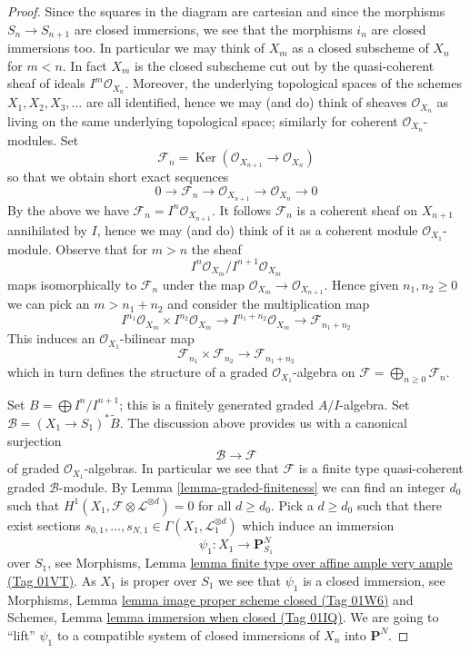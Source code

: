 \documentclass{amsart}
\theoremstyle{plain}
\theoremstyle{definition}
\theoremstyle{remark}
\numberwithin{equation}{subsection}
\def\Ker{\mathop{\mathrm{Ker}}}
\begin{document}
\begin{proof}
Since the squares in the diagram are cartesian and since the morphisms
$S_n \to S_{n + 1}$ are closed immersions, we see that the morphisms
$i_n$ are closed immersions too. In particular we may think of
$X_m$ as a closed subscheme of $X_n$ for $m < n$. In fact $X_m$ is
the closed subscheme cut out by the quasi-coherent sheaf of ideals
$I^m\mathcal{O}_{X_n}$. Moreover, the underlying topological spaces
of the schemes $X_1, X_2, X_3, \ldots$ are all identified, hence we
may (and do) think of sheaves $\mathcal{O}_{X_n}$ as living on the
same underlying topological space; similarly for coherent
$\mathcal{O}_{X_n}$-modules. Set
$$
\mathcal{F}_n =
\Ker(\mathcal{O}_{X_{n + 1}} \to \mathcal{O}_{X_n})
$$
so that we obtain short exact sequences
$$
0 \to \mathcal{F}_n \to \mathcal{O}_{X_{n + 1}} \to \mathcal{O}_{X_n} \to 0
$$
By the above we have $\mathcal{F}_n = I^n\mathcal{O}_{X_{n + 1}}$.
It follows $\mathcal{F}_n$ is a coherent sheaf on $X_{n + 1}$
annihilated by $I$, hence we may (and do) think of it as a coherent
module $\mathcal{O}_{X_1}$-module. Observe that for $m > n$ the sheaf
$$
I^n\mathcal{O}_{X_m}/I^{n + 1}\mathcal{O}_{X_m}
$$
maps isomorphically to $\mathcal{F}_n$ under the map
$\mathcal{O}_{X_m} \to \mathcal{O}_{X_{n + 1}}$. Hence given
$n_1, n_2 \geq 0$ we can pick an $m > n_1 + n_2$ and consider the
multiplication map
$$
I^{n_1}\mathcal{O}_{X_m} \times I^{n_2}\mathcal{O}_{X_m}
\longrightarrow
I^{n_1 + n_2}\mathcal{O}_{X_m} \to \mathcal{F}_{n_1 + n_2}
$$
This induces an $\mathcal{O}_{X_1}$-bilinear map
$$
\mathcal{F}_{n_1} \times \mathcal{F}_{n_2} \longrightarrow
\mathcal{F}_{n_1 + n_2}
$$
which in turn defines the structure of a graded $\mathcal{O}_{X_1}$-algebra
on $\mathcal{F} = \bigoplus_{n \geq 0} \mathcal{F}_n$.

\medskip\noindent
Set $B = \bigoplus I^n/I^{n + 1}$; this is a finitely generated
graded $A/I$-algebra. Set $\mathcal{B} = (X_1 \to S_1)^*\widetilde{B}$.
The discussion above provides us with a canonical surjection
$$
\mathcal{B} \longrightarrow \mathcal{F}
$$
of graded $\mathcal{O}_{X_1}$-algebras. In particular we see that
$\mathcal{F}$ is a finite type quasi-coherent graded $\mathcal{B}$-module.
By Lemma \ref{lemma-graded-finiteness} we can find an integer $d_0$
such that $H^1(X_1, \mathcal{F} \otimes \mathcal{L}^{\otimes d}) = 0$
for all $d \geq d_0$. Pick a $d \geq d_0$ such that there exist sections
$s_{0, 1}, \ldots, s_{N, 1} \in \Gamma(X_1, \mathcal{L}_1^{\otimes d})$
which induce an immersion
$$
\psi_1 : X_1 \to \mathbf{P}^N_{S_1}
$$
over $S_1$, see
Morphisms, Lemma \href{https://stacks.math.columbia.edu/tag/01VT}{lemma finite type over affine ample very ample (Tag 01VT)}.
As $X_1$ is proper over $S_1$ we see that $\psi_1$
is a closed immersion, see
Morphisms, Lemma \href{https://stacks.math.columbia.edu/tag/01W6}{lemma image proper scheme closed (Tag 01W6)}
and
Schemes, Lemma \href{https://stacks.math.columbia.edu/tag/01IQ}{lemma immersion when closed (Tag 01IQ)}.
We are going to ``lift'' $\psi_1$ to a compatible system of
closed immersions of $X_n$ into $\mathbf{P}^N$.


\end{proof}
\end{document}
